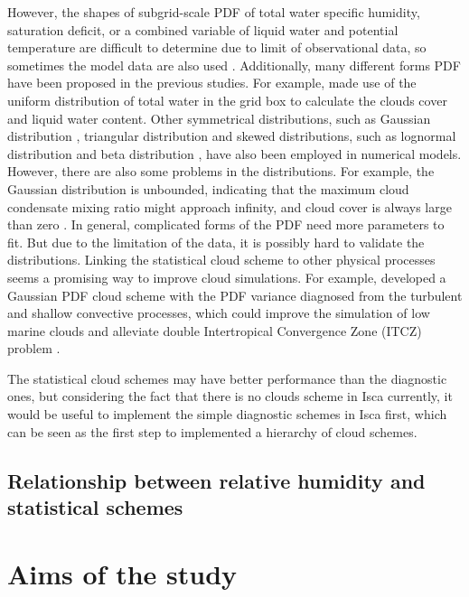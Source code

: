 However, the shapes of subgrid-scale PDF of total water specific
humidity, saturation deficit, or a combined variable of liquid water and potential temperature are difficult to determine due to limit of observational data, so sometimes the model data are also used \citep{Bony2001}. Additionally, many different forms PDF have been proposed in the previous studies. For example, \cite{LeTreut1991} made use of the uniform distribution of total water in the grid box to calculate the clouds cover and liquid water content. Other symmetrical distributions, such as Gaussian distribution \citep{Sommeria1977}, triangular distribution \citep{Smith1990} and skewed distributions, such as lognormal distribution \citep{Bony2001} and beta distribution \citep{Tompkins2002}, have also been employed in numerical models. However, there are also some problems in the distributions. For example, the Gaussian distribution is unbounded, indicating that the maximum cloud condensate mixing ratio might approach infinity, and cloud cover is always large than zero \citep{Tompkins2002}. In general, complicated forms of the PDF need more parameters to fit. But due to the limitation of the data, it is possibly hard to validate the distributions. Linking the statistical cloud scheme to other physical processes seems a promising way to improve cloud simulations. For example, \cite{Qin2018} developed a Gaussian PDF cloud scheme with the PDF variance diagnosed from the turbulent
and shallow convective processes, which could improve the simulation of low marine clouds and alleviate double Intertropical Convergence Zone (ITCZ) problem \citep{Qin2018alleviated}.

The statistical cloud schemes may have better performance than the diagnostic ones, but considering the fact that there is no clouds scheme in Isca currently, it would be useful to implement the simple diagnostic schemes in Isca first, which can be seen as the first step to implemented a hierarchy of cloud schemes.

\subsection{Relationship between relative humidity and statistical schemes}


\section{Aims of the study}
\label{sec:chp2_why_simple_cld_schem_in_isca}

